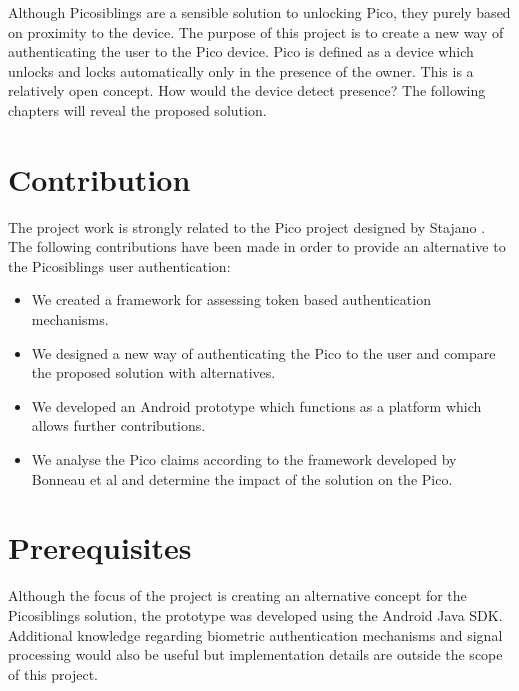 Although Picosiblings are a sensible solution to unlocking Pico, they purely based on proximity to the device. The purpose of this project is to create a new way of authenticating the user to the Pico device. Pico is defined as a device which unlocks and locks automatically only in the presence of the owner. This is a relatively open concept. How would the device detect presence? The following chapters will reveal the proposed solution.

\section{Contribution}
The project work is strongly related to the Pico project designed by Stajano \cite{}. The following contributions have been made in order to provide an alternative to the Picosiblings user authentication:

\begin{itemize}
	\item We created a framework for assessing token based authentication mechanisms.
	\item We designed a new way of authenticating the Pico to the user and compare the proposed solution with alternatives.
	\item We developed an Android prototype which functions as a platform which allows further contributions.
	\item We analyse the Pico claims according to the framework developed by Bonneau et al \cite{} and determine the impact of the solution on the Pico.
\end{itemize}	

\section{Prerequisites}
Although the focus of the project is creating an alternative concept for the Picosiblings solution, the prototype was developed using the Android Java SDK. Additional knowledge regarding biometric authentication mechanisms and signal processing would also be useful but implementation details are outside the scope of this project.